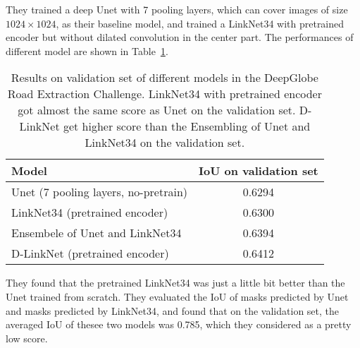 \documentclass[10pt,twocolumn,letterpaper]{article}
\begin{document}
They trained a deep Unet with 7 pooling layers, which can cover images of size $1024\times 1024$, as their baseline model, and trained a LinkNet34 with pretrained encoder but without dilated convolution in the center part. The performances of different model are shown in Table~\ref{tab}.

\begin{table}
\begin{center}
\begin{tabular}{|l|c|}
  \hline
  Model & IoU on validation set \\
  \hline
  \hline
  Unet (7 pooling layers, no-pretrain) & 0.6294 \\
  LinkNet34 (pretrained encoder) & 0.6300 \\
  Ensembele of Unet and LinkNet34 & 0.6394 \\
  D-LinkNet (pretrained encoder) & 0.6412 \\
  \hline
\end{tabular}
\end{center}
\caption{Results on validation set of different models in the DeepGlobe Road Extraction Challenge. LinkNet34 with pretrained encoder got almost the same score as Unet on the validation set. D-LinkNet get higher score than the Ensembling of Unet and LinkNet34 on the validation set.}
\label{tab}
\end{table}

They found that the pretrained LinkNet34 was just a little bit better than the Unet trained from scratch. They evaluated the IoU of masks predicted by Unet and masks predicted by LinkNet34, and found that on the validation set, the averaged IoU of thesee two models was 0.785, which they considered as  a pretty low score.


\balance
{\small


}
\end{document}

